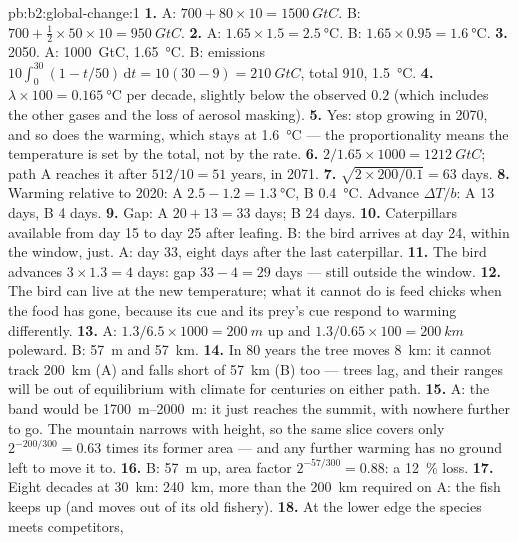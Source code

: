 \begin{solution}{pb:b2:global-change:1}
\textbf{1.} A: $700 + 80\times 10 = \qty{1500}{GtC}$. B: $700 +
\tfrac12\times 50\times 10 = \qty{950}{GtC}$.
\textbf{2.} A: $1.65\times 1.5 = \qty{2.5}{\celsius}$. B:
$1.65\times 0.95 = \qty{1.6}{\celsius}$.
\textbf{3.} 2050. A: \qty{1000}{GtC}, \qty{1.65}{\celsius}. B:
emissions $10\int_0^{30}(1 - t/50)\,\mathrm{d}t = 10(30 - 9) =
\qty{210}{GtC}$, total 910, \qty{1.5}{\celsius}.
\textbf{4.} $\lambda\times 100 = \qty{0.165}{\celsius}$ per decade,
slightly below the observed $0.2$ (which includes the other gases
and the loss of aerosol masking).
\textbf{5.} Yes:  stop growing in 2070, and so
does the warming, which stays at \qty{1.6}{\celsius} --- the
proportionality means the temperature is set by the total, not by
the rate.
\textbf{6.} $2/1.65\times 1000 = \qty{1212}{GtC}$; path A reaches it
after $512/10 = 51$ years, in 2071.
\textbf{7.} $\sqrt{2\times 200/0.1} = 63$ days.
\textbf{8.} Warming relative to 2020: A $2.5 - 1.2 =
\qty{1.3}{\celsius}$, B \qty{0.4}{\celsius}. Advance $\Delta T/b$:
A 13 days, B 4 days.
\textbf{9.} Gap: A $20 + 13 = 33$ days; B 24 days.
\textbf{10.} Caterpillars available from day 15 to day 25 after
leafing. B: the bird arrives at day 24, within the window, just.
A: day 33, eight days after the last caterpillar.
\textbf{11.} The bird advances $3\times 1.3 = 4$ days: gap $33 - 4 =
29$ days --- still outside the window.
\textbf{12.} The bird can live at the new temperature; what it
cannot do is feed chicks when the food has gone, because its cue
and its prey's cue respond to warming differently.
\textbf{13.} A: $1.3/6.5\times 1000 = \qty{200}{m}$ up and
$1.3/0.65\times 100 = \qty{200}{km}$ poleward. B: \qty{57}{m} and
\qty{57}{km}.
\textbf{14.} In 80 years the tree moves \qty{8}{km}: it cannot
track \qty{200}{km} (A) and falls short of \qty{57}{km} (B) too ---
trees lag, and their ranges will be out of equilibrium with climate
for centuries on either path.
\textbf{15.} A: the band would be \qtyrange{1700}{2000}{m}: it just
reaches the summit, with nowhere further to go. The mountain narrows
with height, so the same slice covers only $2^{-200/300} = 0.63$ times
its former area --- and any further warming has no ground left to
move it to.
\textbf{16.} B: \qty{57}{m} up, area factor $2^{-57/300} = 0.88$: a
\qty{12}{\%} loss.
\textbf{17.} Eight decades at \qty{30}{km}: \qty{240}{km}, more than
the \qty{200}{km} required on A: the fish keeps up (and moves out
of its old fishery).
\textbf{18.} At the lower edge the species meets competitors,

\end{solution}
